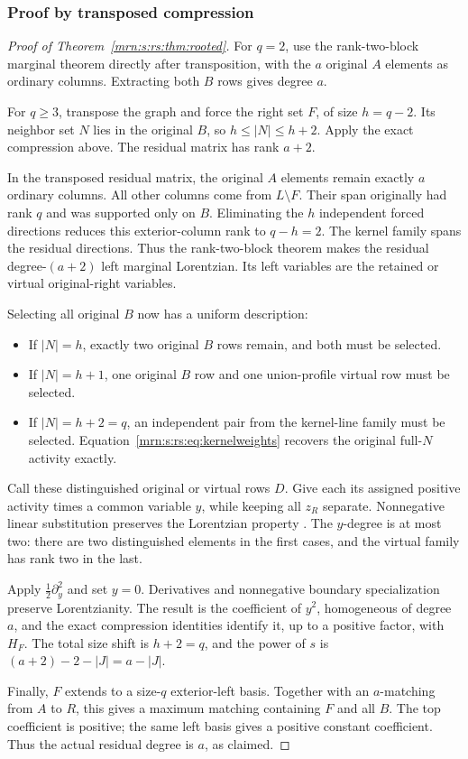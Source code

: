 \documentclass[11pt,a4paper]{article}
\theoremstyle{remark}\newtheorem{remark}[theorem]{Remark}
\begin{document}
\subsubsection{Proof by transposed compression}
\begin{proof}[Proof of Theorem~\ref{mrn:s:rs:thm:rooted}]
For $q=2$, use the rank-two-block marginal theorem directly after transposition, with the $a$ original $A$ elements as ordinary columns. Extracting both $B$ rows gives degree $a$.

For $q\ge3$, transpose the graph and force the right set $F$, of size $h=q-2$. Its neighbor set $N$ lies in the original $B$, so
$h\le|N|\le h+2$. Apply the exact compression above. The residual matrix has rank $a+2$.

In the transposed residual matrix, the original $A$ elements remain exactly $a$ ordinary columns. All other columns come from $L\setminus F$. Their span originally had rank $q$ and was supported only on $B$. Eliminating the $h$ independent forced directions reduces this exterior-column rank to $q-h=2$. The kernel family spans the residual directions. Thus the rank-two-block theorem makes the residual degree-$(a+2)$ left marginal Lorentzian. Its left variables are the retained or virtual original-right variables.

Selecting all original $B$ now has a uniform description:
\begin{itemize}
 \item If $|N|=h$, exactly two original $B$ rows remain, and both must be selected.
 \item If $|N|=h+1$, one original $B$ row and one union-profile virtual row must be selected.
 \item If $|N|=h+2=q$, an independent pair from the kernel-line family must be selected. Equation~\eqref{mrn:s:rs:eq:kernelweights} recovers the original full-$N$ activity exactly.
\end{itemize}
Call these distinguished original or virtual rows $D$. Give each its assigned positive activity times a common variable $y$, while keeping all $z_R$ separate. Nonnegative linear substitution preserves the Lorentzian property \cite{b:BH}. The $y$-degree is at most two: there are two distinguished elements in the first cases, and the virtual family has rank two in the last.

Apply $\tfrac12\partial_y^2$ and set $y=0$. Derivatives and nonnegative boundary specialization preserve Lorentzianity. The result is the coefficient of $y^2$, homogeneous of degree $a$, and the exact compression identities identify it, up to a positive factor, with $H_F$. The total size shift is $h+2=q$, and the power of $s$ is $(a+2)-2-|J|=a-|J|$.

Finally, $F$ extends to a size-$q$ exterior-left basis. Together with an $a$-matching from $A$ to $R$, this gives a maximum matching containing $F$ and all $B$. The top coefficient is positive; the same left basis gives a positive constant coefficient. Thus the actual residual degree is $a$, as claimed.
\end{proof}
\end{document}
